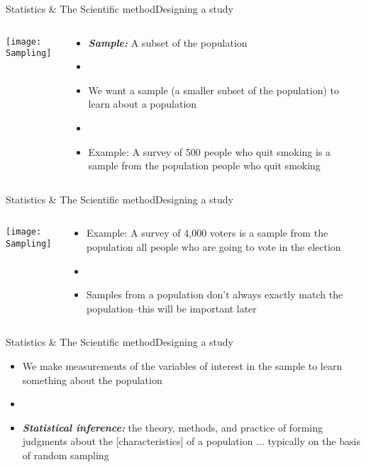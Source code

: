 \documentclass[xcolor=dvipsnames]{beamer}
\begin{document}
\begin{frame}{Statistics \& The Scientific method}{Designing a study}
	\begin{columns}
		\begin{column}{0.5 \textwidth}
			\texttt{[image: Sampling]}
		\end{column}
		\begin{column}{0.5 \textwidth}
			\begin{itemize}
				\item \textbf{\emph{Sample:}} A subset of the population
				\item[]
				\item We want a sample (a smaller subset of the population) to learn about a population
				\item[]
				\item Example: A survey of 500 people who quit smoking is a sample from the population people who quit smoking
			\end{itemize}
		\end{column}
	\end{columns}
\end{frame}

\begin{frame}{Statistics \& The Scientific method}{Designing a study}
	\begin{columns}
		\begin{column}{0.5 \textwidth}
			\texttt{[image: Sampling]}
		\end{column}
		\begin{column}{0.5 \textwidth}
			\begin{itemize}
				\item Example: A survey of 4,000 voters is a sample from the population all people who are going to vote in the election
				\item[]
				\item Samples from a population don’t always exactly match the population--this will be important later
			\end{itemize}
		\end{column}
	\end{columns}
\end{frame}

\begin{frame}{Statistics \& The Scientific method}{Designing a study}
	\begin{itemize}
		\item We make measurements of the variables of interest in the sample to learn something about the population
		\item[]
		\item \textbf{\emph{Statistical inference:}} the theory, methods, and practice of forming judgments about the [characteristics] of a population ... typically on the basis of random sampling
	\end{itemize}
\end{frame}
\end{document}
